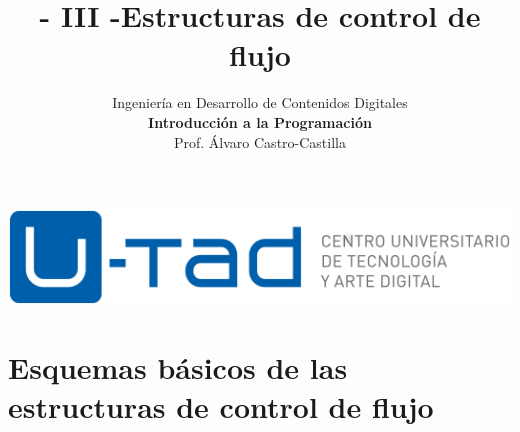 \documentclass[a4paper,oneside]{article}
\title{- III -\linebreak Estructuras de control de flujo}
\author{Ingeniería en Desarrollo de Contenidos Digitales\\ \textbf{Introducción a la Programación}\\ Prof. Álvaro Castro-Castilla}
\date{}
\begin{document}
\maketitle

\begin{center}
\includegraphics[scale=0.3,resolution=300]{images/utad.png}
\end{center}


\section{Esquemas básicos de las estructuras de control de flujo}
\end{document}

